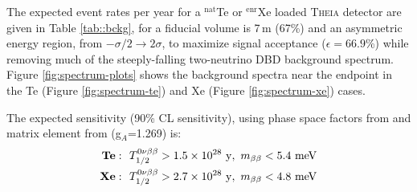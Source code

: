 The expected event rates per year for a $^\mathrm{nat}$Te or $^\mathrm{enr}$Xe loaded \textsc{Theia} detector are given in Table \ref{tab::bckg}, for a fiducial volume is 7\,m (67\%) and an asymmetric energy region,  from $-\sigma/2 \to 2\sigma$, to maximize signal acceptance ($\epsilon=66.9$\%) while removing much of the steeply-falling two-neutrino DBD background spectrum. Figure \ref{fig:spectrum-plots} shows the background spectra near the endpoint in the Te (Figure \ref{fig:spectrum-te}) and Xe (Figure \ref{fig:spectrum-xe}) cases.

The expected sensitivity (90\% CL sensitivity), using phase space factors from \cite{2012PhRvC..85c4316K} and matrix element from \cite{Barea:2013wb} (g$_{A}$=1.269) is:
\begin{eqnarray*}
\mathrm{\bf Te:}~~
  T_{1/2}^{0\nu\beta\beta} > 1.5\times10^{28}~\mathrm{y},~
  m_{\beta\beta} < 5.4~\mathrm{meV}\\
  \mathrm{\bf Xe:}~~
  T_{1/2}^{0\nu\beta\beta} > 2.7\times10^{28}~\mathrm{y},~
  m_{\beta\beta} < 4.8~\mathrm{meV}
\end{eqnarray*}



